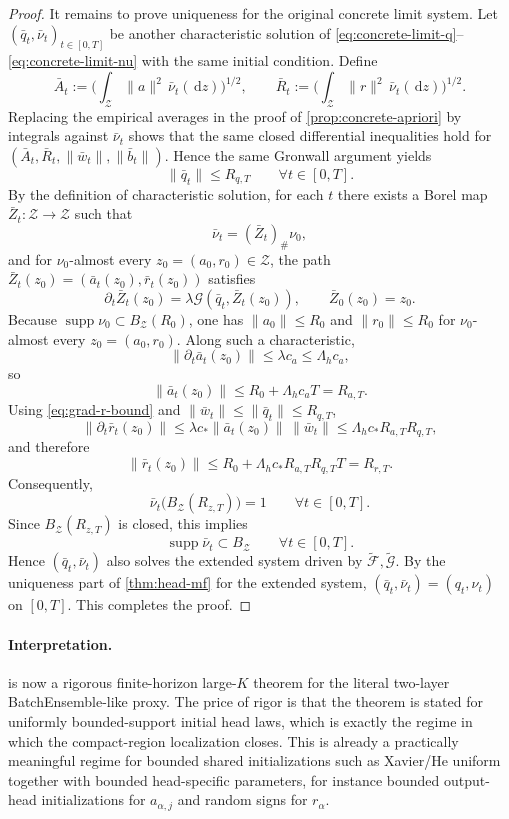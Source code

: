 \documentclass{article}
\theoremstyle{definition}
\newcommand{\dd}{\,\mathrm{d}}
\begin{document}
\begin{proof}
It remains to prove uniqueness for the original concrete limit system. Let $(\bar q_t,\bar\nu_t)_{t\in[0,T]}$ be another characteristic solution of \eqref{eq:concrete-limit-q}--\eqref{eq:concrete-limit-nu} with the same initial condition. Define
\[
  \bar A_t
  :=
  \biggl(
    \int_{\mathcal Z}\|a\|^2\,\bar\nu_t(\dd z)
  \biggr)^{1/2},
  \qquad
  \bar R_t
  :=
  \biggl(
    \int_{\mathcal Z}\|r\|^2\,\bar\nu_t(\dd z)
  \biggr)^{1/2}.
\]
Replacing the empirical averages in the proof of \cref{prop:concrete-apriori} by integrals against $\bar\nu_t$ shows that the same closed differential inequalities hold for $(\bar A_t,\bar R_t,\|\bar w_t\|,\|\bar b_t\|)$. Hence the same Gronwall argument yields
\[
  \|\bar q_t\|\le R_{q,T}
  \qquad
  \forall t\in[0,T].
\]
By the definition of characteristic solution, for each $t$ there exists a Borel map $\bar Z_t:\mathcal Z\to\mathcal Z$ such that
\[
  \bar\nu_t=(\bar Z_t)_\#\nu_0,
\]
and for $\nu_0$-almost every $z_0=(a_0,r_0)\in\mathcal Z$, the path $\bar Z_t(z_0)=(\bar a_t(z_0),\bar r_t(z_0))$ satisfies
\[
  \partial_t \bar Z_t(z_0)
  =
  \lambda \mathcal G(\bar q_t,\bar Z_t(z_0)),
  \qquad
  \bar Z_0(z_0)=z_0.
\]
Because $\operatorname{supp}\nu_0\subset B_{\mathcal Z}(R_0)$, one has $\|a_0\|\le R_0$ and $\|r_0\|\le R_0$ for $\nu_0$-almost every $z_0=(a_0,r_0)$. Along such a characteristic,
\[
  \|\partial_t \bar a_t(z_0)\|
  \le
  \lambda c_a
  \le
  \Lambda_h c_a,
\]
so
\[
  \|\bar a_t(z_0)\|
  \le
  R_0+\Lambda_h c_a T
  =
  R_{a,T}.
\]
Using \eqref{eq:grad-r-bound} and $\|\bar w_t\|\le \|\bar q_t\|\le R_{q,T}$,
\[
  \|\partial_t \bar r_t(z_0)\|
  \le
  \lambda c_\ast \|\bar a_t(z_0)\|\,\|\bar w_t\|
  \le
  \Lambda_h c_\ast R_{a,T}R_{q,T},
\]
and therefore
\[
  \|\bar r_t(z_0)\|
  \le
  R_0+\Lambda_h c_\ast R_{a,T}R_{q,T}T
  =
  R_{r,T}.
\]
Consequently,
\[
  \bar\nu_t\bigl(B_{\mathcal Z}(R_{z,T})\bigr)=1
  \qquad
  \forall t\in[0,T].
\]
Since $B_{\mathcal Z}(R_{z,T})$ is closed, this implies
\[
  \operatorname{supp}\bar\nu_t\subset B_{\mathcal Z}
  \qquad
  \forall t\in[0,T].
\]
Hence $(\bar q_t,\bar\nu_t)$ also solves the extended system driven by $\widetilde{\mathcal F},\widetilde{\mathcal G}$. By the uniqueness part of \cref{thm:head-mf} for the extended system, $(\bar q_t,\bar\nu_t)=(q_t,\nu_t)$ on $[0,T]$. This completes the proof.
\end{proof}

\paragraph{Interpretation.}
 is now a rigorous finite-horizon large-$K$ theorem for the literal two-layer BatchEnsemble-like proxy. The price of rigor is that the theorem is stated for uniformly bounded-support initial head laws, which is exactly the regime in which the compact-region localization closes. This is already a practically meaningful regime for bounded shared initializations such as Xavier/He uniform together with bounded head-specific parameters, for instance bounded output-head initializations for $a_{\alpha,j}$ and random signs for $r_\alpha$.
\end{document}

